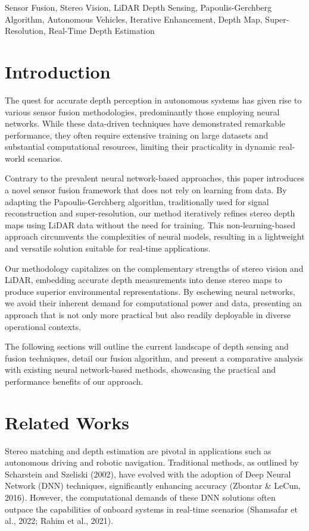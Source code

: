 \documentclass[conference]{IEEEtran}
\begin{document}
\begin{IEEEkeywords}
Sensor Fusion, Stereo Vision, LiDAR Depth Sensing, Papoulis-Gerchberg Algorithm, Autonomous Vehicles, Iterative Enhancement, Depth Map, Super-Resolution, Real-Time Depth Estimation
\end{IEEEkeywords}

\section{Introduction}

The quest for accurate depth perception in autonomous systems has given rise to various sensor fusion methodologies, predominantly those employing neural networks. While these data-driven techniques have demonstrated remarkable performance, they often require extensive training on large datasets and substantial computational resources, limiting their practicality in dynamic real-world scenarios.

Contrary to the prevalent neural network-based approaches, this paper introduces a novel sensor fusion framework that does not rely on learning from data. By adapting the Papoulis-Gerchberg algorithm, traditionally used for signal reconstruction and super-resolution, our method iteratively refines stereo depth maps using LiDAR data without the need for training. This non-learning-based approach circumvents the complexities of neural models, resulting in a lightweight and versatile solution suitable for real-time applications.

Our methodology capitalizes on the complementary strengths of stereo vision and LiDAR, embedding accurate depth measurements into dense stereo maps to produce superior environmental representations. By eschewing neural networks, we avoid their inherent demand for computational power and data, presenting an approach that is not only more practical but also readily deployable in diverse operational contexts.

The following sections will outline the current landscape of depth sensing and fusion techniques, detail our fusion algorithm, and present a comparative analysis with existing neural network-based methods, showcasing the practical and performance benefits of our approach.

\section{Related Works}

Stereo matching and depth estimation are pivotal in applications such as autonomous driving and robotic navigation. Traditional methods, as outlined by Scharstein and Szeliski (2002), have evolved with the adoption of Deep Neural Network (DNN) techniques, significantly enhancing accuracy (Zbontar \& LeCun, 2016). However, the computational demands of these DNN solutions often outpace the capabilities of onboard systems in real-time scenarios (Shamsafar et al., 2022; Rahim et al., 2021).
\end{document}
